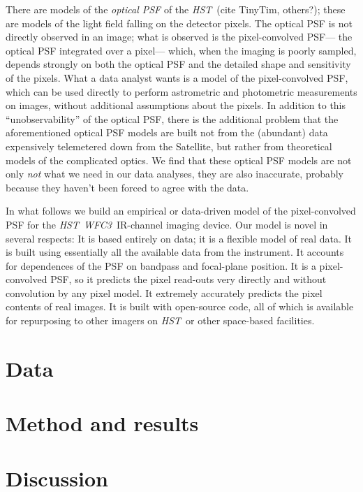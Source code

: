 \documentclass[12pt,letterpaper,preprint]{aastex}
\newcommand{\instrument}[1]{\textsl{#1}}
\newcommand{\HST}{\instrument{HST}}
\newcommand{\WFC}{\instrument{WFC3}}
\begin{document}
There are models of the \emph{optical PSF} of the \HST\ (cite TinyTim, others?);
  these are models of the light field falling on the detector pixels.
The optical PSF is not directly observed in an image;
  what is observed is the pixel-convolved PSF---%
  the optical PSF integrated over a pixel---%
  which, when the imaging is poorly sampled,
  depends strongly on both the optical PSF
  and the detailed shape and sensitivity of the pixels.
What a data analyst wants is a model of the pixel-convolved PSF,
  which can be used directly to perform astrometric and photometric measurements on images,
  without additional assumptions about the pixels.
In addition to this ``unobservability'' of the optical PSF,
  there is the additional problem that the aforementioned optical PSF models
  are built not from the (abundant) data expensively telemetered down from the Satellite,
  but rather from theoretical models of the complicated optics.
We find that these optical PSF models are not only \emph{not} what we need in our data analyses,
  they are also inaccurate, probably because they haven't been forced to agree with the data.

In what follows we build an empirical or data-driven model
  of the pixel-convolved PSF for the \HST\ \WFC\ IR-channel imaging device.
Our model is novel in several respects:
It is based entirely on data;
  it is a flexible model of real data.
It is built using essentially all the available data from the instrument.
It accounts for dependences of the PSF on bandpass and focal-plane position.
It is a pixel-convolved PSF,
  so it predicts the pixel read-outs very directly and without convolution by any pixel model.
It extremely accurately predicts the pixel contents of real images.
It is built with open-source code,
  all of which is available for repurposing to other imagers on \HST\ or other space-based facilities.

\section{Data}

\section{Method and results}

\section{Discussion}
\end{document}

